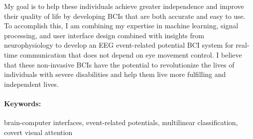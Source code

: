 \documentclass[10pt,a4paper]{article}
\begin{document}
My goal is to help these individuals achieve greater independence and improve their quality of life by developing BCIs that are both accurate and easy to use. To accomplish this, I am combining my expertise in machine learning, signal processing, and user interface design combined with insights from neurophysiology to develop an EEG event-related potential BCI system for real-time communication that does not depend on eye movement control. I believe that these non-invasive BCIs have the potential to revolutionize the lives of individuals with severe disabilities and help them live more fulfilling and independent lives.

\paragraph{Keywords:} brain-computer interfaces, event-related
potentials, multilinear classification, covert visual attention
\end{document}
